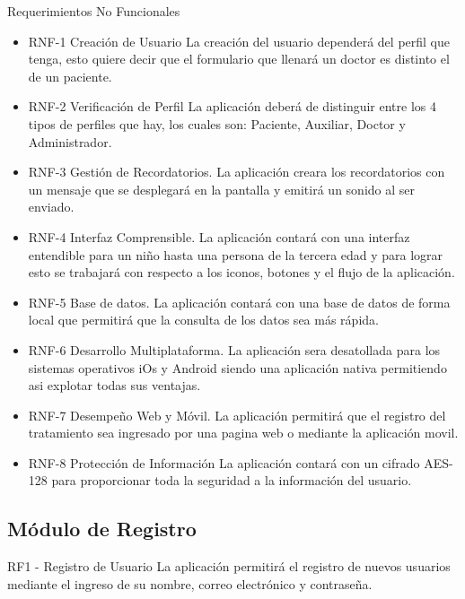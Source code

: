 Requerimientos No Funcionales
\begin{itemize}
	\item RNF-1 Creación de Usuario
	La creación del usuario dependerá del perfil que tenga, esto quiere decir que el formulario que llenará un doctor es distinto el de un paciente.
	\item RNF-2 Verificación de Perfil
	La aplicación deberá de distinguir entre los 4 tipos de perfiles que hay, los cuales son: Paciente, Auxiliar, Doctor y Administrador.
	\item RNF-3 Gestión de Recordatorios.
	La aplicación creara los recordatorios con un mensaje que se desplegará en la pantalla y emitirá un sonido al ser enviado.
	\item RNF-4 Interfaz Comprensible.
	La aplicación contará con una interfaz entendible para un niño hasta una persona de la tercera edad y para lograr esto se trabajará con respecto a los iconos, botones y el flujo de la aplicación.
	\item RNF-5 Base de datos.
	La aplicación contará con una base de datos de forma local que permitirá que la consulta de los datos sea más rápida.
	\item RNF-6 Desarrollo Multiplataforma.
	La aplicación sera desatollada para los sistemas operativos iOs y Android siendo una aplicación nativa permitiendo asi explotar todas sus ventajas.
	\item RNF-7 Desempeño Web y Móvil.
	La aplicación permitirá que el registro del tratamiento sea ingresado por una pagina web o mediante la aplicación movil. 
	\item RNF-8	Protección de Información
	La aplicación contará con un cifrado AES-128 para proporcionar toda la seguridad a la información del usuario.
\end{itemize}





	
	\subsection{Módulo de Registro}
RF1 - Registro de Usuario
La aplicación permitirá el registro de nuevos usuarios mediante el ingreso de su nombre, correo electrónico y contraseña.
	
	\begin{ReqUser}		
		{\alta}{}{\corregir}
	\end{ReqUser}

